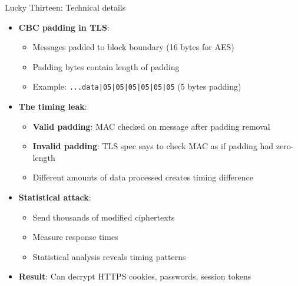 \documentclass[aspectratio=169, lualatex, handout]{beamer}
\begin{document}
\begin{frame}{Lucky Thirteen: Technical details}
	\begin{itemize}[<+->]
		\item \textbf{CBC padding in TLS}:
		      \begin{itemize}
			      \item Messages padded to block boundary (16 bytes for AES)
			      \item Padding bytes contain length of padding
			      \item Example: \texttt{...data|05|05|05|05|05|05} (5 bytes padding)
		      \end{itemize}
		\item \textbf{The timing leak}:
		      \begin{itemize}
			      \item \textbf{Valid padding}: MAC checked on message after padding removal
			      \item \textbf{Invalid padding}: TLS spec says to check MAC as if padding had zero-length
			      \item Different amounts of data processed creates timing difference
		      \end{itemize}
		\item \textbf{Statistical attack}:
		      \begin{itemize}
			      \item Send thousands of modified ciphertexts
			      \item Measure response times
			      \item Statistical analysis reveals timing patterns
		      \end{itemize}
		\item \textbf{Result}: Can decrypt HTTPS cookies, passwords, session tokens
	\end{itemize}
\end{frame}
\end{document}
